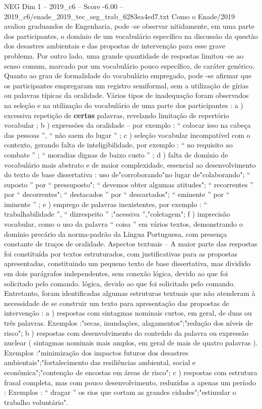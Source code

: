 \begin{textsample}{NEG Dim 1 – 2019\_c6 – Score -6.00 – 2019\_c6/enade\_2019\_tec\_seg\_trab\_6283ea4ed7.txt}
Como o Enade/2019 avaliou graduandos de Engenharia, pode -se observar nitidamente, em uma parte dos participantes, o domínio de um vocabulário específico na discussão da questão dos desastres ambientais e das propostas de intervenção para esse grave problema.
Por outro lado, uma grande quantidade de respostas limitou -se ao senso comum, marcado por um vocabulário pouco específico, de caráter genérico.
Quanto ao grau de formalidade do vocabulário empregado, pode -se afirmar que os participantes empregaram um registro semiformal, sem a utilização de gírias ou palavras típicas da oralidade.
Vários tipos de inadequação foram observados na seleção e na utilização do vocabulário de uma parte dos participantes : a ) excessiva repetição de \textbf{certas} palavras, revelando limitação de repertório vocabular ; b ) expressões da oralidade – por exemplo : “ colocar isso na cabeça das pessoas ”, “ não saem do lugar ” ; c ) seleção vocabular incompatível com o contexto, gerando falta de inteligibilidade, por exemplo : “ no requisito ao combate ” ; “ moradias dignas de baixo custo ” ; d ) falta de domínio de vocabulário mais abstrato e de maior complexidade, essencial ao desenvolvimento do texto de base dissertativa : uso de"corroborando"no lugar de"colaborando"; “ suposto ” por “ pressuposto"; “ devemos obter algumas atitudes"; “ recorrentes ” por “ decorrentes"; “ destacados ” por “ descartados"; “ eminente ” por “ iminente ” ; e ) emprego de palavras inexistentes, por exemplo : “ trabalhabilidade ”, “ dizrespeito ” ;"acessiva ”,"coletagem"; f ) imprecisão vocabular, como o uso da palavra “ coisa ” em vários textos, demonstrando o domínio precário da norma-padrão da Língua Portuguesa, com presença constante de traços de oralidade.
Aspectos textuais – A maior parte das respostas foi constituída por textos estruturados, com justificativas para as propostas apresentadas, constituindo um pequeno texto de base dissertativa, mas dividido em dois parágrafos independentes, sem conexão lógica, devido ao que foi solicitado pelo comando. lógica, devido ao que foi solicitado pelo comando.
Entretanto, foram identificadas algumas estruturas textuais que não atenderam à necessidade de se construir um texto para apresentação das propostas de intervenção : a ) respostas com sintagmas nominais curtos, em geral, de duas ou três palavras.
Exemplos :"secas, inundações, alagamentos";"redução dos níveis de risco"; b ) respostas com desenvolvimento do conteúdo da palavra ou expressão nuclear ( sintagmas nominais mais amplos, em geral de mais de quatro palavras ).
Exemplos :"minimização dos impactos futuros dos desastres ambientais";"fortalecimento das resiliências ambiental, social e econômica";"contenção de encostas em áreas de risco"; c ) respostas com estrutura frasal completa, mas com pouco desenvolvimento, reduzidas a apenas um período : Exemplos : “ dragar ” os rios que cortam as grandes cidades";"estimular o trabalho voluntário".

\end{textsample}
